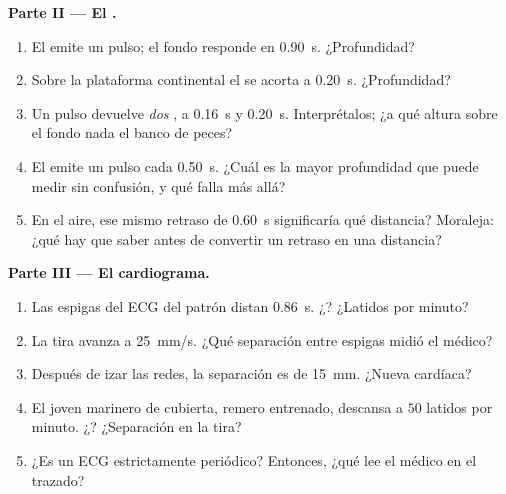 \begin{problem}[{Problema de fin de semana --- leer las señales del
mundo: una sola ley, $d = v\,t$, mide una tormenta, cartografía un fondo
marino, cuenta un latido y deja entrever cómo funciona el GPS}]
\medskip
\noindent\textbf{Parte II --- El .}
\begin{enumerate}[resume]
  \item El  emite un pulso; el fondo responde en \qty{0.90}{s}.
        ¿Profundidad?
  \item Sobre la plataforma continental el  se acorta a
        \qty{0.20}{s}. ¿Profundidad?
  \item Un pulso devuelve \emph{dos} , a \qty{0.16}{s} y
        \qty{0.20}{s}. Interprétalos; ¿a qué altura sobre el fondo nada
        el banco de peces?
  \item El  emite un pulso cada \qty{0.50}{s}. ¿Cuál es la mayor
        profundidad que puede medir sin confusión, y qué falla más
        allá?
  \item En el aire, ese mismo retraso de \qty{0.60}{s} significaría qué
        distancia? Moraleja: ¿qué hay que saber antes de convertir un
        retraso en una distancia?
\end{enumerate}

\medskip
\noindent\textbf{Parte III --- El cardiograma.}
\begin{enumerate}[resume]
  \item Las espigas del ECG del patrón distan \qty{0.86}{s}.
        ¿? ¿Latidos por minuto?
  \item La tira avanza a \qty{25}{mm/s}. ¿Qué separación entre espigas
        midió el médico?
  \item Después de izar las redes, la separación es de \qty{15}{mm}.
        ¿Nueva  cardíaca?
  \item El joven marinero de cubierta, remero entrenado, descansa a $50$
        latidos por minuto. ¿? ¿Separación en la tira?
  \item ¿Es un ECG estrictamente periódico? Entonces, ¿qué lee el médico
        en el trazado?
\end{enumerate}


\end{problem}
